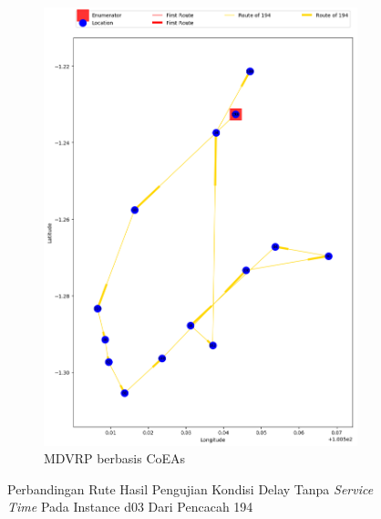 \begin{figure}[H]
	\centering
	\begin{subfigure}[t]{\textwidth}
		\centering
		\includegraphics[width=\textwidth]{Resources/Images/delayed_3/real_m15_n100_delayed_3_194_coes}
		\caption{MDVRP berbasis CoEAs}
		\label{fig:real_m15_n100_delayed_3_194_coes}
	\end{subfigure}
	\caption{Perbandingan Rute Hasil Pengujian Kondisi Delay Tanpa \textit{Service Time} Pada Instance d03 Dari Pencacah 194}
	\label{fig:real_m15_n100_delayed_3_194}
\end{figure}


